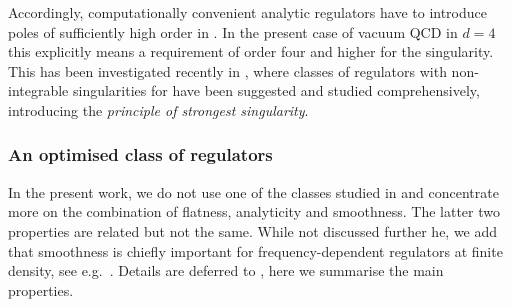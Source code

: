 \documentclass[aps,twocolumn,prd,superscriptaddress]{revtex4-2}
\begin{document}
Accordingly, computationally convenient analytic regulators have to introduce poles of sufficiently high order in . In the present case of vacuum QCD in $d=4$ this explicitly means a requirement of order four and higher for the singularity. This has been investigated recently in \cite{Zorbach:2024zjx}, where classes of regulators with non-integrable singularities for  have been suggested and studied comprehensively, introducing the \textit{principle of strongest singularity}.


\subsubsection{An optimised class of regulators} 
\label{sec:ClassRegulators} 

In the present work, we do not use one of the classes studied in \cite{Zorbach:2024zjx} and concentrate more on the combination of flatness, analyticity and smoothness. The latter two properties are related but not the same. While not discussed further he, we add that smoothness is chiefly important for frequency-dependent regulators at finite density, see e.g.~\cite{Fister:2015eca, Cyrol:2016tym}. Details are deferred to , here we summarise the main properties. 
\end{document}
